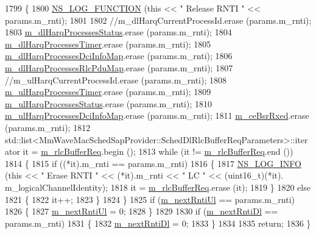 \begin{DoxyCode}
1799 \{
1800   \hyperlink{log-macros-disabled_8h_a90b90d5bad1f39cb1b64923ea94c0761}{NS\_LOG\_FUNCTION} (\textcolor{keyword}{this} << \textcolor{stringliteral}{" Release RNTI "} << params.m\_rnti);
1801 
1802   \textcolor{comment}{//m\_dlHarqCurrentProcessId.erase (params.m\_rnti);}
1803   \hyperlink{classns3_1_1MmWaveFlexTtiMaxRateMacScheduler_a3f74b4d493895851f7ee62f90584fe0c}{m\_dlHarqProcessesStatus}.erase  (params.m\_rnti);
1804   \hyperlink{classns3_1_1MmWaveFlexTtiMaxRateMacScheduler_a8e10f292f6acda7b901589a74252dc95}{m\_dlHarqProcessesTimer}.erase (params.m\_rnti);
1805   \hyperlink{classns3_1_1MmWaveFlexTtiMaxRateMacScheduler_a1595e5398c1750599918db31324a3d68}{m\_dlHarqProcessesDciInfoMap}.erase  (params.m\_rnti);
1806   \hyperlink{classns3_1_1MmWaveFlexTtiMaxRateMacScheduler_a5eeb7aeecc26d9849aadd3da24e00f68}{m\_dlHarqProcessesRlcPduMap}.erase  (params.m\_rnti);
1807   \textcolor{comment}{//m\_ulHarqCurrentProcessId.erase  (params.m\_rnti);}
1808   \hyperlink{classns3_1_1MmWaveFlexTtiMaxRateMacScheduler_af949cb8c0c34fd1e7464931c7138193a}{m\_ulHarqProcessesTimer}.erase (params.m\_rnti);
1809   \hyperlink{classns3_1_1MmWaveFlexTtiMaxRateMacScheduler_a4c1a909f08f91a4c845df5310c35f9ff}{m\_ulHarqProcessesStatus}.erase  (params.m\_rnti);
1810   \hyperlink{classns3_1_1MmWaveFlexTtiMaxRateMacScheduler_a5ae563578daa0d3ea769017d73218ec3}{m\_ulHarqProcessesDciInfoMap}.erase  (params.m\_rnti);
1811   \hyperlink{classns3_1_1MmWaveFlexTtiMaxRateMacScheduler_a15f595669d44bd9f2715d4c1bcddbb83}{m\_ceBsrRxed}.erase (params.m\_rnti);
1812   std::list<MmWaveMacSchedSapProvider::SchedDlRlcBufferReqParameters>::iterator it = 
      \hyperlink{classns3_1_1MmWaveFlexTtiMaxRateMacScheduler_a44dc80f8ce69475652e67f365c55196f}{m\_rlcBufferReq}.begin ();
1813   \textcolor{keywordflow}{while} (it != \hyperlink{classns3_1_1MmWaveFlexTtiMaxRateMacScheduler_a44dc80f8ce69475652e67f365c55196f}{m\_rlcBufferReq}.end ())
1814     \{
1815       \textcolor{keywordflow}{if} ((*it).m\_rnti == params.m\_rnti)
1816         \{
1817           \hyperlink{group__logging_gafbd73ee2cf9f26b319f49086d8e860fb}{NS\_LOG\_INFO} (\textcolor{keyword}{this} << \textcolor{stringliteral}{" Erase RNTI "} << (*it).m\_rnti << \textcolor{stringliteral}{" LC "} << (uint16\_t)(*it).
      m\_logicalChannelIdentity);
1818           it = \hyperlink{classns3_1_1MmWaveFlexTtiMaxRateMacScheduler_a44dc80f8ce69475652e67f365c55196f}{m\_rlcBufferReq}.erase (it);
1819         \}
1820       \textcolor{keywordflow}{else}
1821         \{
1822           it++;
1823         \}
1824     \}
1825   \textcolor{keywordflow}{if} (\hyperlink{classns3_1_1MmWaveFlexTtiMaxRateMacScheduler_af31b2833133e5cb607db2df25a649305}{m\_nextRntiUl} == params.m\_rnti)
1826     \{
1827       \hyperlink{classns3_1_1MmWaveFlexTtiMaxRateMacScheduler_af31b2833133e5cb607db2df25a649305}{m\_nextRntiUl} = 0;
1828     \}
1829 
1830   \textcolor{keywordflow}{if} (\hyperlink{classns3_1_1MmWaveFlexTtiMaxRateMacScheduler_a40b653a664a7071595e9d8529309f765}{m\_nextRntiDl} == params.m\_rnti)
1831     \{
1832       \hyperlink{classns3_1_1MmWaveFlexTtiMaxRateMacScheduler_a40b653a664a7071595e9d8529309f765}{m\_nextRntiDl} = 0;
1833     \}
1834 
1835   \textcolor{keywordflow}{return};
1836 \}
\end{DoxyCode}


